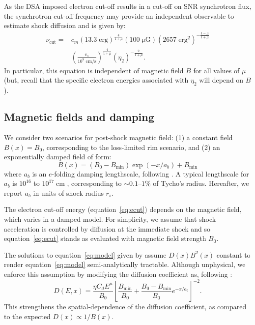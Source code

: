 \documentclass[iop, apj, numberedappendix]{emulateapj}
\newcommand*{\mt}{\mathrm}
\newcommand*{\unit}[1]{\;\mt{#1}}  %
\newcommand*{\abt}{\mathord{\sim}} %
\newcommand*{\Bmin}{B_{\mt{min}}}
\newcommand*{\muG}{\unit{\mu G}}
\begin{document}
As the DSA imposed electron cut-off results in a cut-off on SNR synchrotron
flux, the synchrotron cut-off frequency may provide an independent observable
to estimate shock diffusion and is given by:
\begin{align} \label{eq:cutoff}
    \nu_{\mt{cut}} =
        &c_m \left(13.3 \unit{erg}\right)^{\frac{4}{1+\mu}}
        \left(100 \muG\right)
        \left(2657 \unit{erg^2}\right)^{-\frac{1-\mu}{1+\mu}} \nonumber \\
        &\left( \frac{v_s}{10^8 \unit{cm/s}} \right)^{\frac{4}{1+\mu}}
        \left( \eta_2 \right)^{-\frac{2}{1+\mu}} .
\end{align}
In particular, this equation is independent of magnetic field $B$ for all
values of $\mu$ (but, recall that the specific electron energies associated
with $\eta_2$ will depend on $B$).

\subsection{Magnetic fields and damping}

We consider two scenarios for post-shock magnetic field: (1) a constant field
$B(x) = B_0$, corresponding to the loss-limited rim scenario, and (2) an
exponentially damped field of form:
\begin{equation} \label{eq:bdamp}
    B(x) = \left(B_0 - \Bmin\right) \exp\left(-x / a_b\right)
           + \Bmin
\end{equation}
where $a_b$ is an $e$-folding damping lengthscale, following \citet{pohl2005}.
A typical lengthscale for $a_b$ is $10^{16}$ to $10^{17} \unit{cm}$
\citep{pohl2005}, corresponding to $\abt 0.1$--$1\%$ of Tycho's radius.
Hereafter, we report $a_b$ in units of shock radius $r_s$.

The electron cut-off energy (equation~\eqref{eq:ecut}) depends on the magnetic
field, which varies in a damped model.  For simplicity, we assume that shock
acceleration is controlled by diffusion at the immediate shock and so
equation~\eqref{eq:ecut} stands as evaluated with magnetic field strength
$B_0$.

The solutions to equation~\eqref{eq:model} given by \citet{lerche1980} assume
$D(x) B^2(x)$ constant to render equation~\eqref{eq:model} semi-analytically
tractable.  Although unphysical, we enforce this assumption by modifying the
diffusion coefficient as, following \citet{rettig2012}:
\begin{equation} \label{eq:ddamp}
    D(E,x) = \frac{\eta C_d E^\mu}{B_0}
             \left[ \frac{\Bmin}{B_0} +
                    \frac{B_0 - \Bmin}{B_0} e^{-x/a_b} \right]^{-2} .
\end{equation}
This strengthens the spatial-dependence of the diffusion coefficient, as
compared to the expected $D(x) \propto 1/B(x)$.
\end{document}
